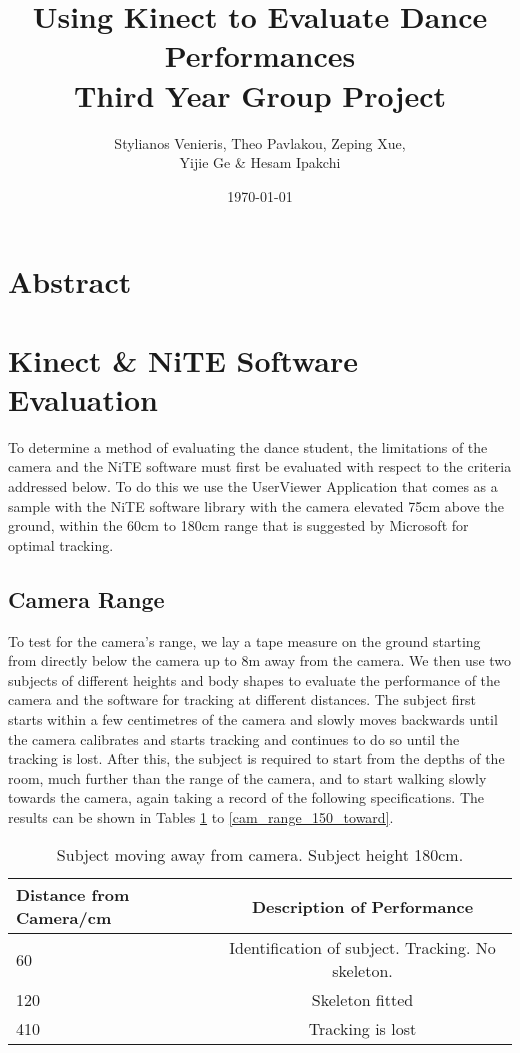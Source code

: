 \documentclass[10pt]{article}
\begin{document}
\title{Using Kinect to Evaluate Dance Performances\\ Third Year Group Project}
\author{Stylianos Venieris, Theo Pavlakou, Zeping Xue, \\ Yijie Ge \& Hesam Ipakchi  }
\date{\today}
\maketitle
\newpage

\section*{\center Abstract}

\section{Kinect \& NiTE Software Evaluation}
\noindent
To determine a method of evaluating the dance student, the limitations of the camera and the NiTE software must first be evaluated with respect to the criteria addressed below. To do this we use the UserViewer Application that comes as a sample with the NiTE software library with the camera elevated 75cm above the ground, within the 60cm to 180cm range that is suggested by Microsoft for optimal tracking. 

\subsection{Camera Range}
\noindent 
To test for the camera's range, we lay a tape measure on the ground starting from directly below the camera up to 8m away from the camera. We then use two subjects of different heights and body shapes to evaluate the performance of the camera and the software for tracking at different distances. The subject first starts within a few centimetres of the camera and slowly moves backwards until the camera calibrates and starts tracking and continues to do so until the tracking is lost. After this, the subject is required to start from the depths of the room, much further than the range of the camera, and to start walking slowly towards the camera, again taking a record of the following specifications. The results can be shown in Tables \ref{cam_range_180_away} to \ref{cam_range_150_toward}.
\\
\begin{table}[h]
\center
\begin{tabular}{ | l | c |}
\hline
Distance from Camera/cm & Description of Performance \\
\hline
60 & Identification of subject. Tracking. No skeleton.\\
120 & Skeleton fitted\\
410 & Tracking is lost\\
\hline
\end{tabular}
\caption{Subject moving away from camera. Subject height 180cm.}
\label{cam_range_180_away}
\end{table}
\end{document}
